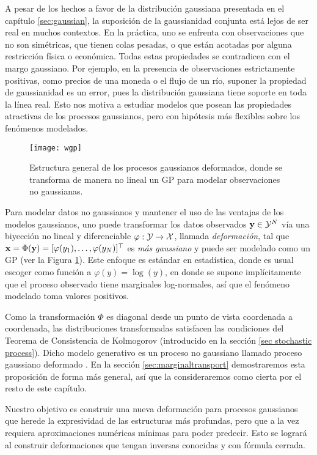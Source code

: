A pesar de los hechos a favor de la distribución gaussiana presentada en el capítulo \ref{sec:gaussian}, la suposición de la gaussianidad conjunta está lejos de ser real en muchos contextos. En la práctica, uno se enfrenta con observaciones que no son simétricas, que tienen colas pesadas, o que están acotadas por alguna restricción física o económica. Todas estas propiedades se contradicen con el margo gaussiano. Por ejemplo, en la presencia de observaciones estrictamente positivas, como precios de una moneda o el flujo de un río, suponer la propiedad de gaussianidad es un error, pues la distribución gaussiana tiene soporte en toda la línea real. Esto nos motiva a estudiar modelos que posean las propiedades atractivas de los procesos gaussianos, pero con hipótesis más flexibles sobre los fenómenos modelados.

\begin{figure}[h]
	\centering
	\texttt{[image: wgp]}
	\caption{Estructura general de los procesos gaussianos deformados, donde se transforma de manera no lineal un GP para modelar observaciones no gaussianas.}
	\label{fig:wgp}
\end{figure}

Para modelar datos no gaussianos y mantener el uso de las ventajas de los modelos gaussianos, uno puede transformar los datos observados \(\mathbf{y} \in \mathcal{Y}^N\) vía una biyección no lineal y diferenciable \(\varphi : \mathcal{Y} \to \mathcal{X}\), llamada \emph{deformación}, tal que \(\mathbf{x} = \Phi(\mathbf{y}) = [\varphi(y_1), \dotsc, \varphi(y_N)]^\top\) es \emph{más gaussiano} y puede ser modelado como un GP (ver la Figura \ref{fig:wgp}). Este enfoque es estándar en estadística, donde es usual escoger como función a \(\varphi(y) = \log(y)\), en donde se supone implícitamente que el proceso observado tiene marginales log-normales, así que el fenómeno modelado toma valores positivos.

Como la transformación \(\Phi\) es diagonal desde un punto de vista coordenada a coordenada, las distribuciones transformadas satisfacen las condiciones del Teorema de Consistencia de Kolmogorov \cite{tao2011introduction} (introducido en la sección \ref{sec stochastic process}). Dicho modelo generativo es un proceso no gaussiano llamado proceso gaussiano deformado \cite{snelson2004warped}. En la sección \ref{sec:marginaltransport} demostraremos esta proposición de forma más general, así que la consideraremos como cierta por el resto de este capítulo.

Nuestro objetivo es construir una nueva deformación para procesos gaussianos que herede la expresividad de las estructuras más profundas, pero que a la vez requiera aproximaciones numéricas mínimas para poder predecir. Esto se logrará al construir deformaciones que tengan inversas conocidas y con fórmula cerrada.

